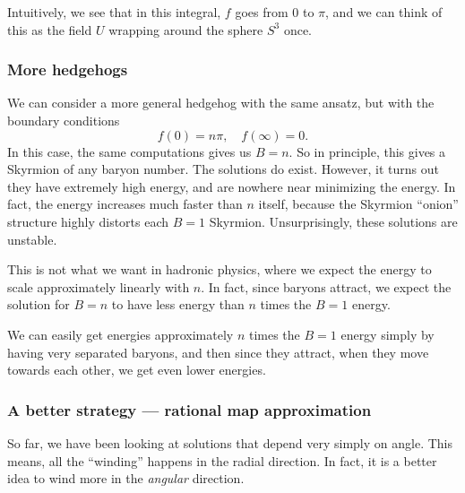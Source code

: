 \documentclass[a4paper]{article}
\begin{document}
Intuitively, we see that in this integral, $f$ goes from $0$ to $\pi$, and we can think of this as the field $U$ wrapping around the sphere $S^3$ once.

\subsubsection*{More hedgehogs}
We can consider a more general hedgehog with the same ansatz, but with the boundary conditions
\[
  f(0) = n\pi,\quad f(\infty) = 0.
\]
In this case, the same computations gives us $B = n$. So in principle, this gives a Skyrmion of any baryon number. The solutions do exist. However, it turns out they have extremely high energy, and are nowhere near minimizing the energy. In fact, the energy increases much faster than $n$ itself, because the Skyrmion ``onion'' structure highly distorts each $B = 1$ Skyrmion. Unsurprisingly, these solutions are unstable.

This is not what we want in hadronic physics, where we expect the energy to scale approximately linearly with $n$. In fact, since baryons attract, we expect the solution for $B = n$ to have less energy than $n$ times the $B = 1$ energy.

We can easily get energies approximately $n$ times the $B = 1$ energy simply by having very separated baryons, and then since they attract, when they move towards each other, we get even lower energies.


\subsubsection*{A better strategy --- rational map approximation}
So far, we have been looking at solutions that depend very simply on angle. This means, all the ``winding'' happens in the radial direction. In fact, it is a better idea to wind more in the \emph{angular} direction.
\end{document}
